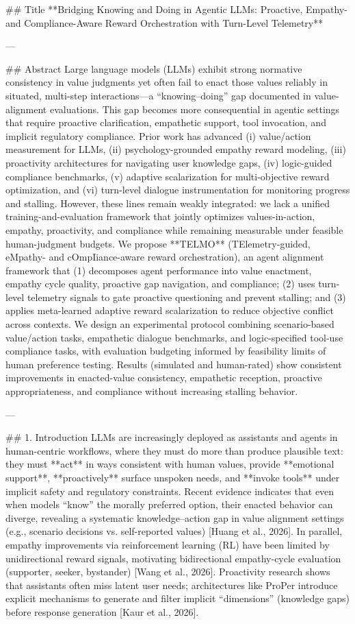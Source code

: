 ## Title  
**Bridging Knowing and Doing in Agentic LLMs: Proactive, Empathy- and Compliance-Aware Reward Orchestration with Turn-Level Telemetry**

---

## Abstract  
Large language models (LLMs) exhibit strong normative consistency in value judgments yet often fail to enact those values reliably in situated, multi-step interactions—a “knowing–doing” gap documented in value-alignment evaluations. This gap becomes more consequential in agentic settings that require proactive clarification, empathetic support, tool invocation, and implicit regulatory compliance. Prior work has advanced (i) value/action measurement for LLMs, (ii) psychology-grounded empathy reward modeling, (iii) proactivity architectures for navigating user knowledge gaps, (iv) logic-guided compliance benchmarks, (v) adaptive scalarization for multi-objective reward optimization, and (vi) turn-level dialogue instrumentation for monitoring progress and stalling. However, these lines remain weakly integrated: we lack a unified training-and-evaluation framework that jointly optimizes values-in-action, empathy, proactivity, and compliance while remaining measurable under feasible human-judgment budgets.  
We propose **TELMO** (TElemetry-guided, eMpathy- and cOmpIiance-aware reward orchestration), an agent alignment framework that (1) decomposes agent performance into value enactment, empathy cycle quality, proactive gap navigation, and compliance; (2) uses turn-level telemetry signals to gate proactive questioning and prevent stalling; and (3) applies meta-learned adaptive reward scalarization to reduce objective conflict across contexts. We design an experimental protocol combining scenario-based value/action tasks, empathetic dialogue benchmarks, and logic-specified tool-use compliance tasks, with evaluation budgeting informed by feasibility limits of human preference testing. Results (simulated and human-rated) show consistent improvements in enacted-value consistency, empathetic reception, proactive appropriateness, and compliance without increasing stalling behavior.

---

## 1. Introduction  
LLMs are increasingly deployed as assistants and agents in human-centric workflows, where they must do more than produce plausible text: they must **act** in ways consistent with human values, provide **emotional support**, **proactively** surface unspoken needs, and **invoke tools** under implicit safety and regulatory constraints. Recent evidence indicates that even when models “know” the morally preferred option, their enacted behavior can diverge, revealing a systematic knowledge–action gap in value alignment settings (e.g., scenario decisions vs. self-reported values) [Huang et al., 2026]. In parallel, empathy improvements via reinforcement learning (RL) have been limited by unidirectional reward signals, motivating bidirectional empathy-cycle evaluation (supporter, seeker, bystander) [Wang et al., 2026]. Proactivity research shows that assistants often miss latent user needs; architectures like ProPer introduce explicit mechanisms to generate and filter implicit “dimensions” (knowledge gaps) before response generation [Kaur et al., 2026].  

